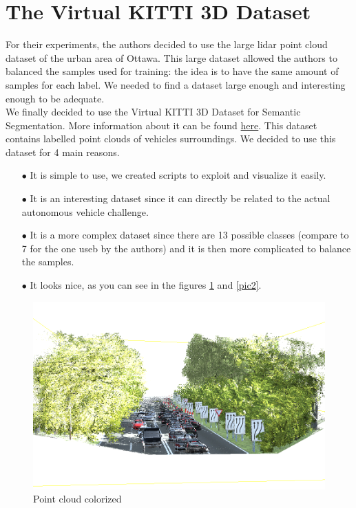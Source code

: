 \section{The Virtual KITTI 3D Dataset}
\label{sec:dataset}

For their experiments, the authors decided to use the large \gls{lidar} point cloud dataset of the urban area of Ottawa. This large dataset allowed the authors to balanced the samples used for training: the idea is to have the same amount of samples for each label. We needed to find a dataset large enough and interesting enough to be adequate.\\

We finally decided to use the Virtual KITTI 3D Dataset for Semantic Segmentation. More information about it can be found \href{https://github.com/VisualComputingInstitute/vkitti3D-dataset.git}{here}. This dataset contains labelled point clouds of vehicles surroundings. We decided to use this dataset for 4 main reasons.
\begin{itemize}
    \item[\(\bullet \)] It is simple to use, we created scripts to exploit and visualize it easily.
    \item[\(\bullet \)] It is an interesting dataset since it can directly be related to the actual autonomous vehicle challenge.
    \item[\(\bullet \)] It is a more complex dataset since there are 13 possible classes (compare to 7 for the one useb by the authors) and it is then more complicated to balance the samples.
    \item[\(\bullet \)] It looks nice, as you can see in the figures \ref{pic1} and \ref{pic2}.
\end{itemize}

\begin{figure}[H]
    \centering
	\includegraphics[scale=0.3]{sources/pic1.png}
	\caption{Point cloud colorized}
	\label{pic1}
\end{figure}


